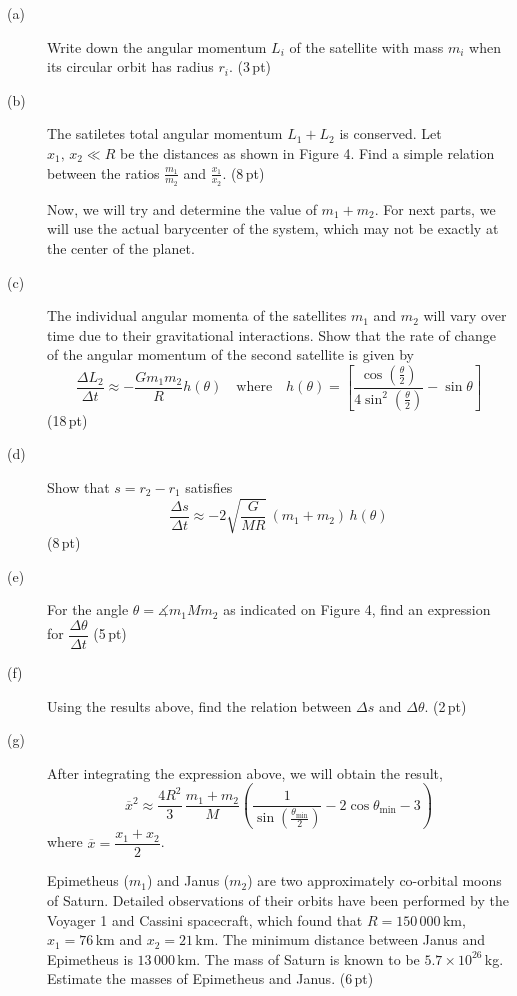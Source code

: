 \begin{description}
\item[(a)] Write down the angular momentum $L_i$ of the satellite with mass
  $m_i$ when its circular orbit has radius $r_i$. \hfill(3\,pt)
\item[(b)] The satiletes total angular momentum $L_1 + L_2$ is conserved. Let
  $x_1,\,x_2 \ll R$ be the distances as shown in Figure 4. Find a simple
  relation between the ratios $\frac{m_1}{m_2}$ and $\frac{x_1}{x_2}$.
  \hfill(8\,pt)

  Now, we will try and determine the value of $m_1 + m_2$. For next parts, we
  will use the actual barycenter of the system, which may not be exactly at
  the center of the planet.
\item[(c)] The individual angular momenta of the satellites $m_1$ and $m_2$
  will vary over time due to their gravitational interactions. Show that the
  rate of change of the angular momentum of the second satellite is given by
  \[ \frac{\Delta L_2}{\Delta t} \approx -\frac{G m_1 m_2}{R} h(\theta)
     \quad\text{where}\quad
     h(\theta) = \left[
       \frac{\cos\left(\frac{\theta}{2}\right)}
            {4\sin^2\left(\frac{\theta}{2}\right)} - \sin\theta \right] \]
  \hfill(18\,pt)
\item[(d)] Show that $s = r_2 - r_1$ satisfies
  \[ \frac{\Delta s}{\Delta t} \approx
     -2\sqrt{\frac{G}{MR}}\,(m_1 + m_2)\,h(\theta) \]
  \hfill(8\,pt)
\item[(e)] For the angle $\theta = \measuredangle m_1 M m_2$ as indicated on
  Figure 4, find an expression for
  $\dfrac{\Delta\theta}{\Delta t}$ \hfill(5\,pt)
\item[(f)] Using the results above, find the relation between $\Delta s$ and
  $\Delta\theta$. \hfill(2\,pt)
\item[(g)] After integrating the expression above, we will obtain the result,
  \[ \overline{x}^2 \approx \frac{4R^2}{3}\,\frac{m_1 + m_2}{M}
     \left( \frac{1}{\sin\left(\frac{\theta_{\min}}{2}\right)}
       - 2\cos\theta_{\min} - 3 \right) \]
  where $\overline{x} = \dfrac{x_1 + x_2}{2}$.

  Epimetheus ($m_1$) and Janus ($m_2$) are two approximately co-orbital moons
  of Saturn. Detailed observations of their orbits have been performed by the
  Voyager 1 and Cassini spacecraft, which found that $R = 150\,000$\,km,
  $x_1 = 76$\,km and $x_2 = 21$\,km. The minimum distance between Janus and
  Epimetheus is $13\,000$\,km. The mass of Saturn is known to be
  $5.7 \times 10^{26}$\,kg. Estimate the masses of Epimetheus and Janus.
  \hfill(6\,pt)
\end{description}
